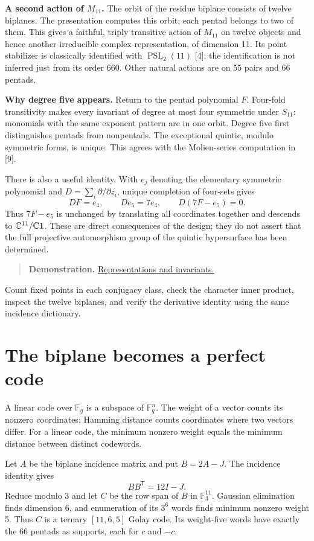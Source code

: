 \documentclass[12pt,letterpaper]{article}
\theoremstyle{definition}
\theoremstyle{remark}
\newenvironment{toolnote}{\begin{quote}\small\color{navy}}{\end{quote}}
\newcommand{\F}{\mathbb F}\newcommand{\Z}{\mathbb Z}
\DeclareMathOperator{\PSL}{PSL}\DeclareMathOperator{\Isom}{Isom}
\newcommand{\pageheading}[1]{\clearpage\section{#1}}
\newcommand{\demolink}[2]{\href{https://gtevelev-max.github.io/mathieu/\##1}{#2}}
\newcommand{\demobox}[2]{\begin{toolnote}\textbf{Demonstration.} \demolink{#1}{#2}\end{toolnote}}
\begin{document}
\textbf{A second action of $M_{11}$.} The orbit of the residue biplane consists of twelve biplanes. The presentation computes this orbit; each pentad belongs to two of them. This gives a faithful, triply transitive action of $M_{11}$ on twelve objects and hence another irreducible complex representation, of dimension 11. Its point stabilizer is classically identified with $\PSL_2(11)$ [4]; the identification is not inferred just from its order 660. Other natural actions are on 55 pairs and 66 pentads.

\textbf{Why degree five appears.} Return to the pentad polynomial $F$. Four-fold transitivity makes every invariant of degree at most four symmetric under $S_{11}$: monomials with the same exponent pattern are in one orbit. Degree five first distinguishes pentads from nonpentads. The exceptional quintic, modulo symmetric forms, is unique. This agrees with the Molien-series computation in [9].

There is also a useful identity. With $e_j$ denoting the elementary symmetric polynomial and $D=\sum_i\partial/\partial z_i$, unique completion of four-sets gives
\[
 DF=e_4,\qquad De_5=7e_4,\qquad D(7F-e_5)=0.
\]
Thus $7F-e_5$ is unchanged by translating all coordinates together and descends to $\mathbb C^{11}/\mathbb C\mathbf1$. These are direct consequences of the design; they do not assert that the full projective automorphism group of the quintic hypersurface has been determined.

\demobox{representations?group=11}{Representations and invariants.} Count fixed points in each conjugacy class, check the character inner product, inspect the twelve biplanes, and verify the derivative identity using the same incidence dictionary.

\hypertarget{codes}{}
\pageheading{The biplane becomes a perfect code}
A linear code over $\F_q$ is a subspace of $\F_q^n$. The weight of a vector counts its nonzero coordinates; Hamming distance counts coordinates where two vectors differ. For a linear code, the minimum nonzero weight equals the minimum distance between distinct codewords.

Let $A$ be the biplane incidence matrix and put $B=2A-J$. The incidence identity gives
\[
 BB^{\mathsf T}=12I-J.
\]
Reduce modulo 3 and let $C$ be the row span of $B$ in $\F_3^{11}$. Gaussian elimination finds dimension 6, and enumeration of its $3^6$ words finds minimum nonzero weight 5. Thus $C$ is a ternary $[11,6,5]$ Golay code. Its weight-five words have exactly the 66 pentads as supports, each for $c$ and $-c$.
\end{document}
